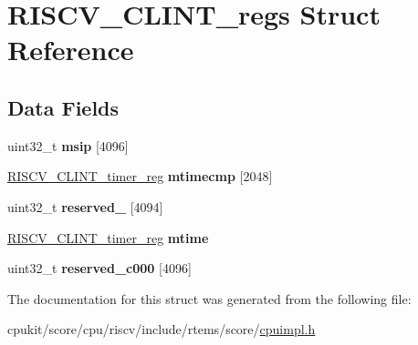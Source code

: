 \hypertarget{structRISCV__CLINT__regs}{}\section{R\+I\+S\+C\+V\+\_\+\+C\+L\+I\+N\+T\+\_\+regs Struct Reference}
\label{structRISCV__CLINT__regs}
\subsection*{Data Fields}
\begin{DoxyCompactItemize}
\item 
\mbox{\label{structRISCV__CLINT__regs_ade19fbc94fc714a57af214af68f34ec1}} 
uint32\+\_\+t {\bfseries msip} \mbox{[}4096\mbox{]}
\item 
\mbox{\label{structRISCV__CLINT__regs_aed211d3e6f1b268647e5cb51bf082eee}} 
\mbox{\hyperlink{unionRISCV__CLINT__timer__reg}{R\+I\+S\+C\+V\+\_\+\+C\+L\+I\+N\+T\+\_\+timer\+\_\+reg}} {\bfseries mtimecmp} \mbox{[}2048\mbox{]}
\item 
\mbox{\label{structRISCV__CLINT__regs_a6cfb14e851fd905277a2b06ee7596763}} 
uint32\+\_\+t {\bfseries reserved\+\_} \mbox{[}4094\mbox{]}
\item 
\mbox{\label{structRISCV__CLINT__regs_ac7cc0c88fed8e5063b267854438f4cea}} 
\mbox{\hyperlink{unionRISCV__CLINT__timer__reg}{R\+I\+S\+C\+V\+\_\+\+C\+L\+I\+N\+T\+\_\+timer\+\_\+reg}} {\bfseries mtime}
\item 
\mbox{\label{structRISCV__CLINT__regs_ac8bfec374e7f7eeb217b26c3fc1eac5d}} 
uint32\+\_\+t {\bfseries reserved\+\_\+c000} \mbox{[}4096\mbox{]}
\end{DoxyCompactItemize}


The documentation for this struct was generated from the following file\+:\begin{DoxyCompactItemize}
\item 
cpukit/score/cpu/riscv/include/rtems/score/\mbox{\hyperlink{riscv_2include_2rtems_2score_2cpuimpl_8h}{cpuimpl.\+h}}\end{DoxyCompactItemize}
